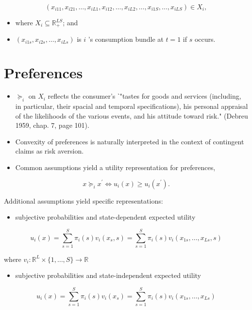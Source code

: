 \documentclass[10pt]{article}
\begin{document}
$$
\left(x_{i 11}, x_{i 21}, \ldots, x_{i L 1}, x_{i 12}, \ldots, x_{i L 2}, \ldots, x_{i 1 S}, \ldots, x_{i L S}\right) \in X_{i},
$$

\begin{itemize}
  \item where $X_{i} \subseteq \mathbb{R}_{+}^{L S}$; and
  \item $\left(x_{i 1 s}, x_{i 2 s}, \ldots, x_{i L s}\right)$ is $i$ 's consumption bundle at $t=1$ if $s$ occurs.
\end{itemize}

\section*{Preferences}
\begin{itemize}
  \item $\succeq_{i}$ on $X_{i}$ reflects the consumer's ˋ"tastes for goods and services (including, in particular, their spacial and temporal specifications), his personal appraisal of the likelihoods of the various events, and his attitude toward risk." (Debreu 1959, chap. 7, page 101).
  \item Convexity of preferences is naturally interpreted in the context of contingent claims as risk aversion.
  \item Common assumptions yield a utility representation for preferences,
\end{itemize}

$$
x \succeq_{i} x^{\prime} \Longleftrightarrow u_{i}(x) \geq u_{i}\left(x^{\prime}\right) .
$$

Additional assumptions yield specific representations:

\begin{itemize}
  \item subjective probabilities and state-dependent expected utility
\end{itemize}

$$
u_{i}(x)=\sum_{s=1}^{S} \pi_{i}(s) v_{i}\left(x_{s}, s\right)=\sum_{s=1}^{S} \pi_{i}(s) v_{i}\left(x_{1 s}, \ldots, x_{L s}, s\right)
$$

where $v_{i}: \mathbb{R}^{L} \times\{1, \ldots, S\} \rightarrow \mathbb{R}$

\begin{itemize}
  \item subjective probabilities and state-independent expected utility
\end{itemize}

$$
u_{i}(x)=\sum_{s=1}^{S} \pi_{i}(s) v_{i}\left(x_{s}\right)=\sum_{s=1}^{S} \pi_{i}(s) v_{i}\left(x_{1 s}, \ldots, x_{L s}\right)
$$
\end{document}
